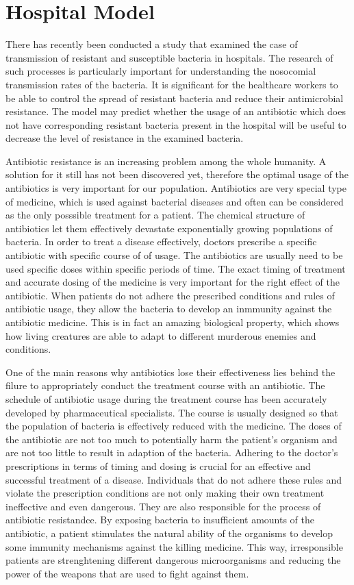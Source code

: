 \chapter*{Hospital Model}


There has recently been conducted a study that examined the case of transmission of resistant and susceptible bacteria in hospitals. The research of such processes is particularly important for understanding the nosocomial transmission rates of the bacteria. It is significant for the healthcare workers to be able to control the spread of resistant bacteria and reduce their antimicrobial resistance. The model may predict whether the usage of an antibiotic which does not have corresponding resistant bacteria present in the hospital will be useful to decrease the level of resistance in the examined bacteria.

Antibiotic resistance is an increasing problem among the whole humanity. A solution for it still has not been discovered yet, therefore the optimal usage of the antibiotics is very important for our population. Antibiotics are very special type of medicine, which is used against bacterial diseases and often can be considered as the only posssible treatment for a patient. The chemical structure of antibiotics let them effectively devastate exponentially growing populations of bacteria. In order to treat a disease effectively, doctors prescribe a specific antibiotic with specific course of of usage. The antibiotics are usually need to be used specific doses within specific periods of time. The exact timing of treatment and accurate dosing of the medicine is very important for the right effect of the antibiotic. When patients do not adhere the prescribed conditions and rules of antibiotic usage, they allow the bacteria to develop an inmmunity against the antibiotic medicine. This is in fact an amazing biological property, which shows how living creatures are able to adapt to different murderous enemies and conditions.

One of the main reasons why antibiotics lose their effectiveness lies behind the filure to appropriately conduct the treatment course with an antibiotic. The schedule of antibiotic usage during the treatment course has been accurately developed by pharmaceutical specialists. The course is usually designed so that the population of bacteria is effectively reduced with the medicine. The doses of the antibiotic are not too much to potentially harm the patient's organism and are not too little to result in adaption of the bacteria. Adhering to the doctor's prescriptions in terms of timing and dosing is crucial for an effective and successful treatment of a disease. Individuals that do not adhere these rules and violate the prescription conditions are not only making their own treatment ineffective and even dangerous. They are also responsible for the process of antibiotic resistandce. By exposing bacteria to insufficient amounts of the antibiotic, a patient stimulates the natural ability of the organisms to develop some immunity mechanisms against the killing medicine. This way, irresponsible patients are strenghtening different dangerous microorganisms and reducing the power of the weapons that are used to fight against them.